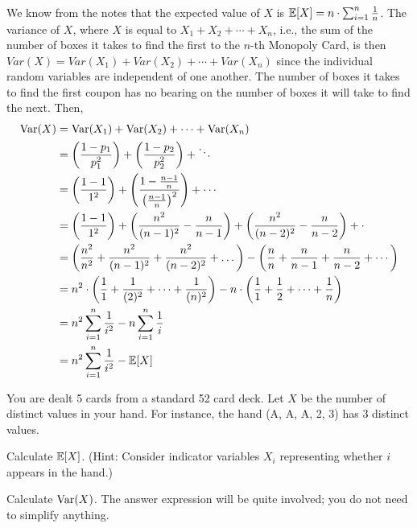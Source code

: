 \documentclass[11pt]{article}
\begin{document}
\begin{solution}

We know from the notes that the expected value of $X$ is $\operatorname{\mathbb{E}}[X] = n \cdot 
\sum_{i=1}^{n} \frac{1}{n}$. The variance of $X$, where $X$ is equal to $X_1 + 
X_2 + \cdots + X_n$, i.e., the sum of the number of boxes it takes to find the
first to the $n$-th Monopoly Card, is then $Var(X) = Var(X_1) + Var(X_2) + \cdots 
+ Var(X_n)$ since the individual random variables are independent of one another.
The number of boxes it takes to find the first coupon has no bearing on the 
number of boxes it will take to find the next. Then, 
\[
	\begin{split}
		\operatorname{Var}(X) &= \operatorname{Var}(X_1) + \operatorname{Var}(X_2) + \dots + \operatorname{Var}(X_n) \\
		&= \left( \frac{1-p_1}{p_1^2} \right) + \left( \frac{1-p_2}{p_2^2} \right) + \ddots \\
		&= \left( \frac{1-1}{1^2} \right) + \left( \frac{1-\frac{n-1}{n}}{\left( \frac{n-1}{n} \right)^2} \right) + \cdots \\
		&= \left( \frac{1-1}{1^2} \right) + \left( \frac{n^2}{(n-1)^2} - \frac{n}{n-1} \right) + \left( \frac{n^2}{(n-2)^2} - \frac{n}{n-2} \right) + \cdot \\
		&= \left( \frac{n^2}{n^2} + \frac{n^2}{(n-1)^2}  + \frac{n^2}{(n-2)^2} + \dots \right) 
		- \left( \frac{n}{n} + \frac{n}{n-1} + \frac{n}{n-2} + \cdots \right) \\
		&= n^2 \cdot \left( \frac{1}{1} + \frac{1}{(2)^2}  + \dots + \frac{1}{(n)^2} \right) 
		- n \cdot \left( \frac{1}{1} + \frac{1}{2} + \dots + \frac{1}{n}  \right) \\
		&= n^2 \sum_{i=1}^{n} \frac{1}{i^2} - n \sum_{i=1}^{n} \frac{1}{i} \\
		&= n^2 \sum_{i=1}^{n} \frac{1}{i^2} - \operatorname{\mathbb{E}}[X]
	\end{split}
\]

\end{solution}


You are dealt 5 cards from a standard 52 card deck. Let $X$ be the number of 
distinct values in your hand. For instance, the hand (A, A, A, 2, 3) has 3 
distinct values.

\begin{Parts}

\Part Calculate $\operatorname{\mathbb{E}}[X]$. (Hint: Consider indicator variables $X_i$ representing 
whether $i$ appears in the hand.)

\Part Calculate $\operatorname{Var}(X)$. The answer expression will be quite involved; you do 
not need to simplify anything.

\end{Parts}
\end{document}
